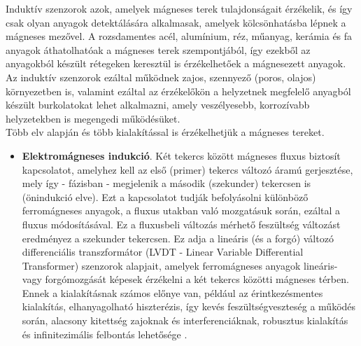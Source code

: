 Induktív szenzorok azok, amelyek mágneses terek tulajdonságait érzékelik, és így csak olyan anyagok detektálására alkalmasak, amelyek kölcsönhatásba lépnek a mágneses mezővel. A rozsdamentes acél, alumínium, réz, műanyag, kerámia és fa anyagok áthatolhatóak a mágneses terek szempontjából, így ezekből az anyagokból készült rétegeken keresztül is érzékelhetőek a mágnesezett anyagok. Az induktív szenzorok ezáltal működnek zajos, szennyező (poros, olajos) környezetben is, valamint ezáltal az érzékelőkön a helyzetnek megfelelő anyagból készült burkolatokat lehet alkalmazni, amely veszélyesebb, korrozívabb helyzetekben is megengedi működésüket.\\
Több elv alapján és több kialakítással is érzékelhetjük a mágneses tereket.
\begin{itemize}
	\item \textbf{Elektromágneses indukció}. Két tekercs között mágneses fluxus biztosít kapcsolatot, amelyhez kell az első (primer) tekercs változó áramú gerjesztése, mely így - fázisban - megjelenik a második (szekunder) tekercsen is (önindukció elve). Ezt a kapcsolatot tudják befolyásolni különböző ferromágneses anyagok, a fluxus utakban való mozgatásuk során, ezáltal a fluxus módosításával. Ez a fluxusbeli változás mérhető feszültség változást eredményez a szekunder tekercsen. Ez adja a lineáris (és a forgó) változó differenciális transzformátor (LVDT - Linear Variable Differential Transformer) szenzorok alapjait, amelyek ferromágneses anyagok lineáris- vagy forgómozgását képesek érzékelni a két tekercs közötti mágneses térben. Ennek a kialakításnak számos előnye van, például az érintkezésmentes kialakítás, elhanyagolható hiszterézis, így kevés feszültségveszteség a működés során, alacsony kitettség zajoknak és interferenciáknak, robusztus kialakítás és infinitezimális felbontás lehetősége \cite{Fraden2016a}.

\end{itemize}
